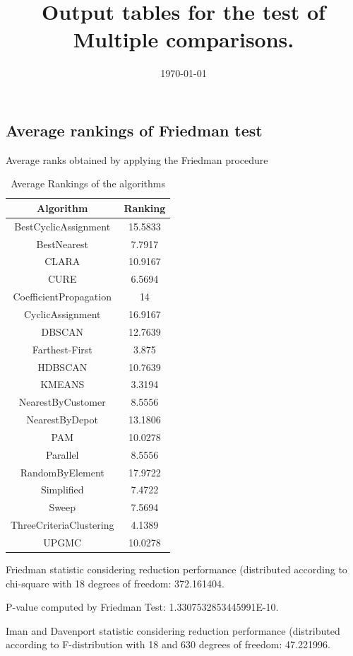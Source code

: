 \documentclass[a4paper,10pt]{article}
\title{Output tables for the test of Multiple comparisons.}
\author{}
\date{\today}
\begin{document}
\begin{landscape}
\pagestyle{empty}
\maketitle
\thispagestyle{empty}
\section{Average rankings of Friedman test}



Average ranks obtained by applying the Friedman procedure

\begin{table}[!htp]
\centering
\begin{tabular}{|c|c|}\hline
Algorithm&Ranking\\\hline
BestCyclicAssignment & 15.5833\\
BestNearest & 7.7917\\
CLARA & 10.9167\\
CURE & 6.5694\\
CoefficientPropagation & 14\\
CyclicAssignment & 16.9167\\
DBSCAN & 12.7639\\
Farthest-First & 3.875\\
HDBSCAN & 10.7639\\
KMEANS & 3.3194\\
NearestByCustomer & 8.5556\\
NearestByDepot & 13.1806\\
PAM & 10.0278\\
Parallel & 8.5556\\
RandomByElement & 17.9722\\
Simplified & 7.4722\\
Sweep & 7.5694\\
ThreeCriteriaClustering & 4.1389\\
UPGMC & 10.0278\\
\hline
\end{tabular}
\caption{Average Rankings of the algorithms}
\end{table}

Friedman statistic considering reduction performance (distributed according to chi-square with 18 degrees of freedom: 372.161404.

P-value computed by Friedman Test: 1.3307532853445991E-10.\newline

Iman and Davenport statistic considering reduction performance (distributed according to F-distribution with 18 and 630 degrees of freedom: 47.221996.


\end{landscape}
\end{document}
